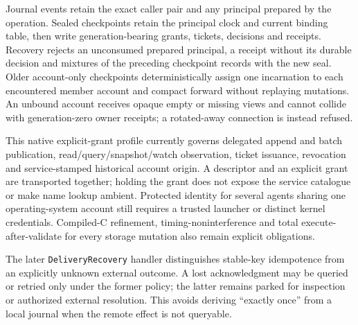 \documentclass[11pt]{article}
\theoremstyle{definition}
\theoremstyle{remark}
\begin{document}
Journal events retain the exact caller pair and any principal prepared by the
operation.  Sealed checkpoints retain the principal clock and current binding
table, then write generation-bearing grants, tickets, decisions and receipts.
Recovery rejects an unconsumed prepared principal, a receipt without its
durable decision and mixtures of the preceding checkpoint records with the
new seal.  Older account-only checkpoints deterministically assign one
incarnation to each encountered member account and compact forward without
replaying mutations.  An unbound account receives opaque empty or missing
views and cannot collide with generation-zero owner receipts; a rotated-away
connection is instead refused.

This native explicit-grant profile currently governs delegated append and
batch publication, read/query/snapshot/watch observation, ticket issuance,
revocation and service-stamped historical account origin.  A descriptor and
an explicit grant are transported together; holding the grant does not expose
the service catalogue or make name lookup ambient.  Protected identity for
several agents sharing one operating-system account still requires a trusted
launcher or distinct kernel credentials.  Compiled-C refinement,
timing-noninterference and total execute-after-validate for every storage
mutation also remain explicit obligations.

The later \nolinkurl{DeliveryRecovery} handler distinguishes
stable-key idempotence from an explicitly unknown external outcome.  A lost
acknowledgment may be queried or retried only under the former policy; the
latter remains parked for inspection or authorized external resolution.  This
avoids deriving ``exactly once'' from a local journal when the remote effect is
not queryable.
\end{document}
